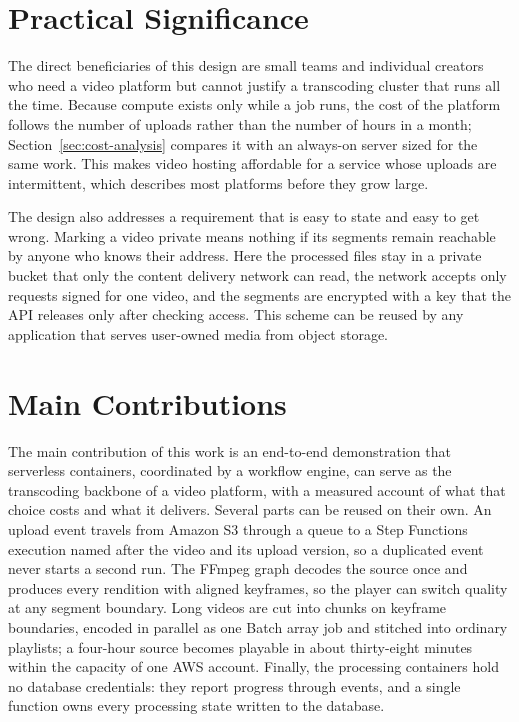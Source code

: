 \section{Practical Significance}
\label{sec:significance}

The direct beneficiaries of this design are small teams and individual creators who need a video
platform but cannot justify a transcoding cluster that runs all the time. Because compute exists
only while a job runs, the cost of the platform follows the number of uploads rather than the
number of hours in a month; Section~\ref{sec:cost-analysis} compares it with an always-on server
sized for the same work. This makes video hosting affordable for a service whose uploads are
intermittent, which describes most platforms before they grow large.

The design also addresses a requirement that is easy to state and easy to get wrong. Marking a video
private means nothing if its segments remain reachable by anyone who knows their address. Here the
processed files stay in a private bucket that only the content delivery network can read, the
network accepts only requests signed for one video, and the segments are encrypted with a key that
the API releases only after checking access. This scheme can be reused by any application that
serves user-owned media from object storage.

\section{Main Contributions}
\label{sec:contributions}

The main contribution of this work is an end-to-end demonstration that serverless containers,
coordinated by a workflow engine, can serve as the transcoding backbone of a video platform, with a
measured account of what that choice costs and what it delivers. Several parts can be reused on
their own. An upload event travels from Amazon S3 through a queue to a Step Functions execution
named after the video and its upload version, so a duplicated event never starts a second run.
The FFmpeg graph decodes the source once and produces every rendition with aligned keyframes, so the
player can switch quality at any segment boundary. Long videos are cut into chunks on keyframe
boundaries, encoded in parallel as one Batch array job and stitched into ordinary playlists; a
four-hour source becomes playable in about thirty-eight minutes within the capacity of one AWS
account. Finally, the processing containers hold no database credentials: they report progress
through events, and a single function owns every processing state written to the database.

